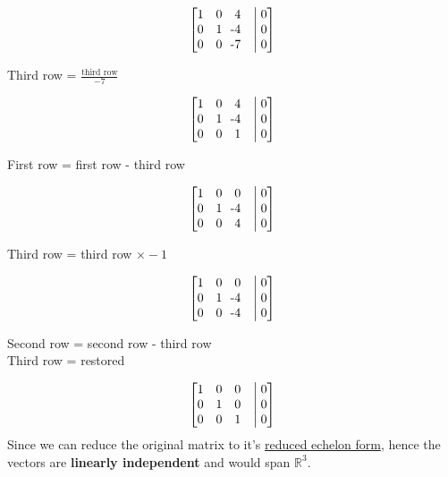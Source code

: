 \documentclass[11pt]{article}
\begin{document}
\vspace*{-\baselineskip}
\begin{align*}
    \begin{bmatrix}
    1 & 0 & 4 &\bigm| 0\\
    0 & 1 & \llap{-}4 &\bigm| 0\\
    0 & 0 & \llap{-}7 &\bigm| 0\\
    \end{bmatrix}
\end{align*}
\begin{center}
Third row = $\frac{\text{third row}}{-\text{7}}$
\end{center}
\vspace*{-\baselineskip}
\begin{align*}
    \begin{bmatrix}
    1 & 0 & 4 &\bigm| 0\\
    0 & 1 & \llap{-}4 &\bigm| 0\\
    0 & 0 & 1 &\bigm| 0\\
    \end{bmatrix}
\end{align*}
\begin{center}
First row = first row - third row
\end{center}
\vspace*{-\baselineskip}
\begin{align*}
    \begin{bmatrix}
    1 & 0 & 0 &\bigm| 0\\
    0 & 1 & \llap{-}4 &\bigm| 0\\
    0 & 0 & 4 &\bigm| 0\\
    \end{bmatrix}
\end{align*}
\begin{center}
Third row = third row $\times -1$ 
\end{center}
\vspace*{-\baselineskip}
\begin{align*}
    \begin{bmatrix}
    1 & 0 & 0 &\bigm| 0\\
    0 & 1 & \llap{-}4 &\bigm| 0\\
    0 & 0 & \llap{-}4 &\bigm| 0\\
    \end{bmatrix}
\end{align*}
\begin{center}
Second row = second row - third row\\
Third row = restored
\end{center}
\vspace*{-\baselineskip}
\begin{align*}
    \begin{bmatrix}
    1 & 0 & 0 &\bigm| 0\\
    0 & 1 & 0 &\bigm| 0\\
    0 & 0 & 1 &\bigm| 0\\
    \end{bmatrix}
\end{align*}
Since we can reduce the original matrix to it's \underline{reduced echelon form}, hence the vectors are \textbf{linearly independent} and would span $\mathbb{R}^3$.
 
\end{document}

